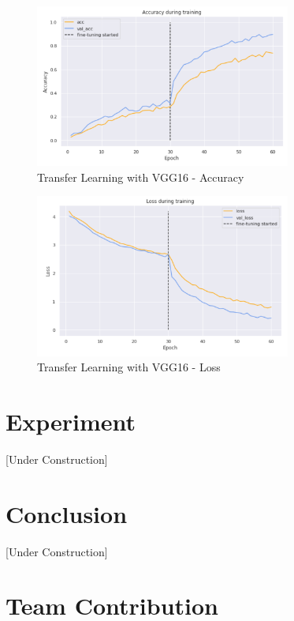 \documentclass[paper=a4, fontsize=11pt]{scrartcl}
\numberwithin{equation}{section}		%
\numberwithin{table}{section}				%
\begin{document}
\begin{figure}[h!]
    \centering
    \includegraphics[width=0.75\textwidth]{TLaccuracy.png}
    \caption{Transfer Learning with VGG16 - Accuracy}
    \label{fig:TLACC}
\end{figure}

\begin{figure}[h!]
    \centering
    \includegraphics[width=0.75\textwidth]{TLloss.png}
    \caption{Transfer Learning with VGG16 - Loss}
    \label{fig:TLLOSS}
\end{figure}

\section{Experiment}\label{sec: experiment}

[Under Construction]

\section{Conclusion}\label{sec: conlusion}

[Under Construction]

\needspace{20em}%
\section{Team Contribution}\label{sec: teamcontribution}
\end{document}
